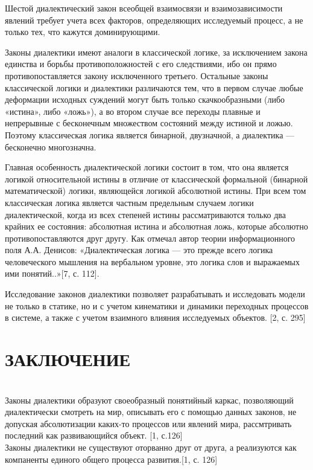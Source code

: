 \documentclass[a4paper,12pt]{report}
\begin{document}
     Шестой диалектический закон всеобщей взаимосвязи и взаимозависимости явлений требует учета всех факторов, определяющих исследуемый процесс, а не только тех, что кажутся доминирующими.
     
 Законы диалектики имеют аналоги в классической логике, за исключением закона единства и борьбы противоположностей с его следствиями, ибо он прямо противопоставляется закону исключенного третьего. Остальные законы классической логики и диалектики различаются тем, что в первом случае любые деформации исходных суждений могут быть только скачкообразными (либо «истина», либо «ложь»), а во втором случае все переходы плавные и непрерывные с бесконечным множеством состояний между истиной и ложью. Поэтому классическая логика является бинарной, двузначной, а диалектика — бесконечно многозначна. 
 
 Главная особенность диалектической логики состоит в том, что она является логикой относительной истины в отличие от классической формальной (бинарной математической) логики, являющейся логикой абсолютной истины. При всем том классическая логика является частным предельным случаем логики диалектической, когда из всех степеней истины рассматриваются только два крайних ее состояния: абсолютная истина и абсолютная ложь, которые абсолютно противопоставляются друг другу. Как отмечал автор теории информационного поля А.А. Денисов: «Диалектическая логика — это прежде всего логика человеческого мышления на вербальном уровне, это логика слов и выражаемых ими понятий..»[7, с. 112].
	
	Исследование законов диалектики позволяет разрабатывать и исследовать модели не только в статике, но и с учетом кинематики и динамики переходных процессов в системе, а также с учетом взаимного влияния исследуемых объектов. [2, с. 295]\\
	

\chapter*{ЗАКЛЮЧЕНИЕ }
 \\
 
Законы диалектики образуют своеобразный понятийный каркас, позволяющий диалектически смотреть на мир, описывать его с помощью данных законов, не допуская абсолютизации каких-то процессов или явлений мира, рассмтривать последний как развивающийся объект. [1, с.126]\\
Законы диалектики не существуют оторванно  друг от друга, а реализуются как компаненты единого общего процесса развития.[1, с. 126]
\end{document}
